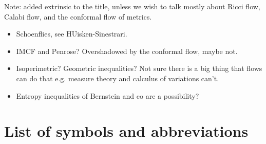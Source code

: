 \documentclass{amsart}
\theoremstyle{definition}
\begin{document}
\begin{refsection}
Note: added extrinsic to the title, unless we wish to talk mostly about Ricci flow, Calabi flow, and the conformal flow of metrics.

\begin{itemize}
\item Schoenflies, see HUisken-Sinestrari.
\item IMCF and Penrose? Overshadowed by the conformal flow, maybe not.
\item Isoperimetric? Geometric inequalities? Not sure there is a big thing that flows can do that e.g. measure theory and calculus of variations can't.
\item Entropy inequalities of Bernstein and co are a possibility?
\end{itemize}

\printbibliography[heading=subbibliography]
\end{refsection}

\section{List of symbols and abbreviations}
\end{document}

